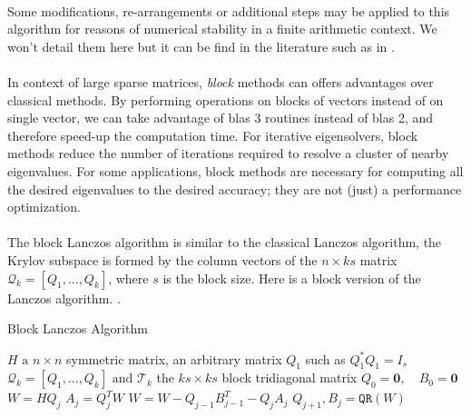 \paragraph*{}
Some modifications, re-arrangements or additional steps may be applied to this algorithm for reasons of numerical stability in a finite arithmetic context. We won't detail them here but it can be find in the literature such as in \cite{Golub1996}.

\paragraph*{}
In context of large sparse matrices, \textit{block} methods can offers advantages over classical methods. By performing operations on blocks of vectors instead of on single vector, we can take advantage of \acrshort{blas} 3 routines instead of \acrshort{blas} 2, and therefore speed-up the computation time. For iterative eigensolvers, block methods reduce the number of iterations required to resolve a cluster of nearby eigenvalues. For some applications, block methods are necessary for computing all the desired eigenvalues to the desired accuracy; they are not (just) a performance optimization.

\paragraph*{}
The block Lanczos algorithm is similar to the classical Lanczos algorithm, the Krylov subspace is formed by the column vectors of the $n\times ks$ matrix $\mathcal{Q}_k=[Q_1,...,Q_k]$, where $s$ is the block size.
Here is a block version of the Lanczos algorithm. \cite{Grimes1994}.

\begin{algorithm}
\caption{Block Lanczos Algorithm}\label{alg:block_lanczos}
\begin{algorithmic}[1]
\Require $H \text{ a } n\times n $ symmetric matrix, an arbitrary matrix $Q_1$ such as $Q_1^*Q_1 = I_s$
\Ensure $ \mathcal{Q}_k=[Q_1,...,Q_k] \text{ and } \mathcal{T}_k$ the $ks\times ks$ block tridiagonal matrix
\State $Q_0 = \mathbf{0}, \quad B_0 = \mathbf{0}$
    \State $W = HQ_j$
    \State $A_j = Q_j^T W$
    \State $W = W - Q_{j-1}B_{j-1}^T - Q_j A_j$
    \State $Q_{j+1}, B_{j} = \mathtt{QR}(W)$ 
\EndFor
\end{algorithmic}
\end{algorithm}

